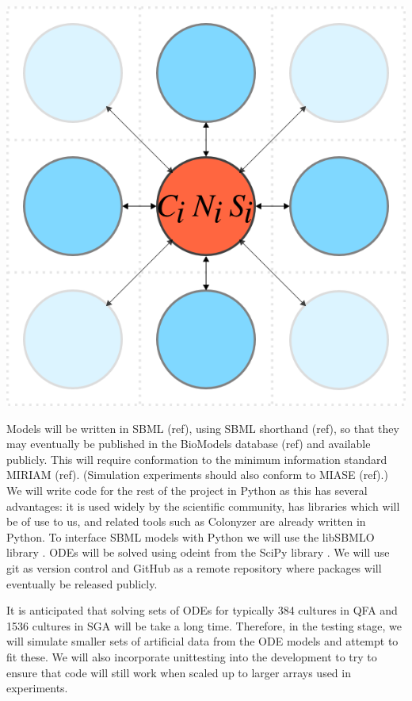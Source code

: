\begin{Figure}
  \centering
  \includegraphics[width=\linewidth]{square_array}
  \label{fig:simple_model}
\end{Figure}

Models will be written in SBML (ref), using SBML shorthand (ref), so
that they may eventually be published in the BioModels database (ref)
and available publicly. This will require conformation to the minimum
information standard MIRIAM (ref). (Simulation experiments should also
conform to MIASE (ref).) We will write code for the rest of the
project in Python as this has several advantages: it is used widely by
the scientific community, has libraries which will be of use to us,
and related tools such as Colonyzer \citet{Lawless2010} are already
written in Python. To interface SBML models with Python we will use
the libSBMLO library \citep{Bornstein2008}. ODEs will be solved using
odeint from the SciPy library \citep{SciPy}. We will use git as
version control and GitHub as a remote repository where packages will
eventually be released publicly.

It is anticipated that solving sets of ODEs for typically 384 cultures
in QFA and 1536 cultures in SGA will be take a long time. Therefore,
in the testing stage, we will simulate smaller sets of artificial data
from the ODE models and attempt to fit these. We will also incorporate
unittesting into the development to try to ensure that code will
still work when scaled up to larger arrays used in experiments.

